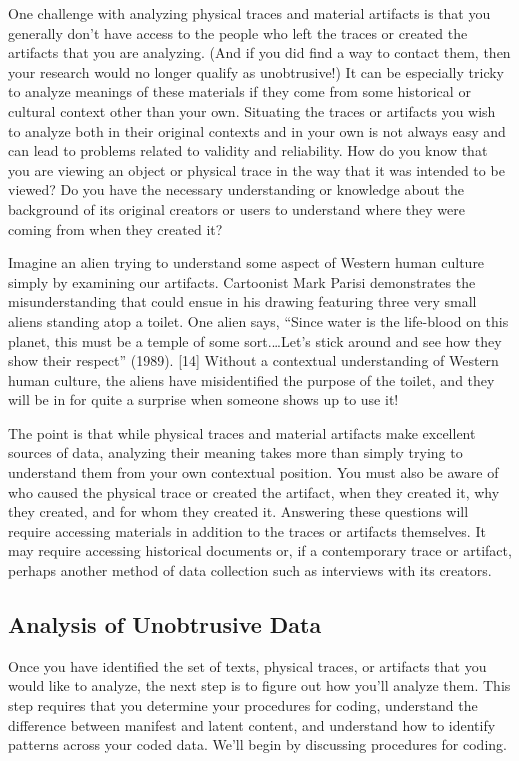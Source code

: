 One challenge with analyzing physical traces and material artifacts is that you generally don’t have access to the people who left the traces or created the artifacts that you are analyzing. (And if you did find a way to contact them, then your research would no longer qualify as unobtrusive!) It can be especially tricky to analyze meanings of these materials if they come from some historical or cultural context other than your own. Situating the traces or artifacts you wish to analyze both in their original contexts and in your own is not always easy and can lead to problems related to validity and reliability. How do you know that you are viewing an object or physical trace in the way that it was intended to be viewed? Do you have the necessary understanding or knowledge about the background of its original creators or users to understand where they were coming from when they created it?

Imagine an alien trying to understand some aspect of Western human culture simply by examining our artifacts. Cartoonist Mark Parisi demonstrates the misunderstanding that could ensue in his drawing featuring three very small aliens standing atop a toilet. One alien says, “Since water is the life-blood on this planet, this must be a temple of some sort.…Let’s stick around and see how they show their respect” (1989). [14] Without a contextual understanding of Western human culture, the aliens have misidentified the purpose of the toilet, and they will be in for quite a surprise when someone shows up to use it!

The point is that while physical traces and material artifacts make excellent sources of data, analyzing their meaning takes more than simply trying to understand them from your own contextual position. You must also be aware of who caused the physical trace or created the artifact, when they created it, why they created, and for whom they created it. Answering these questions will require accessing materials in addition to the traces or artifacts themselves. It may require accessing historical documents or, if a contemporary trace or artifact, perhaps another method of data collection such as interviews with its creators.

\subsection{Analysis of Unobtrusive Data}

Once you have identified the set of texts, physical traces, or artifacts that you would like to analyze, the next step is to figure out how you’ll analyze them. This step requires that you determine your procedures for coding, understand the difference between manifest and latent content, and understand how to identify patterns across your coded data. We’ll begin by discussing procedures for coding.


